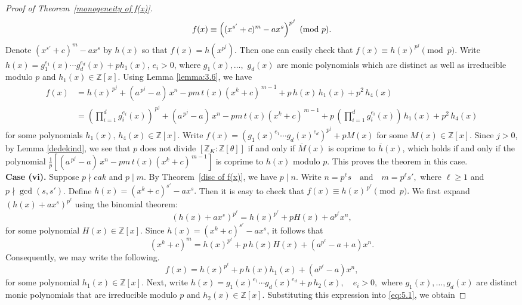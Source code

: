 \documentclass[table]{amsart}
\newcommand{\Z}{\mathbb{Z}}
\numberwithin{equation}{section}
\begin{document}
\begin{proof}[Proof of Theorem~\ref{monogeneity of f(x)}]
\[
f(x) \equiv \Bigl( (x^{s'} + c)^m - a x^s \Bigr)^{p^{j}} \pmod{p}.
\]
 Denote  $ (x^{s'} + c)^m - a x^s$ by $h(x)$ so that $f(x)=h(x^{p^j})$. Then one can easily check that $f(x)\equiv h(x)^{p^j} \pmod{p}$. Write $h(x) = g^{e_1}_1(x)\cdots g^{e_d}_d(x) + ph_1(x)$, $e_i>0$, where $g_1(x), \ldots,$ $g_d(x)$ are monic polynomials which are distinct as well as irreducible modulo $p$ and $h_1(x) \in \Z[x]$. Using Lemma \ref{lemma:3.6}, we have
\begin{align*}
    f(x) &=  h(x)^{\,p^{j}}+(a^{\,p^{j}} - a)\,x^{n} - p m\, t(x)(x^{k} + c)^{\,m-1}+ p\,h(x)\,h_{1}(x) + p^{2}\,h_{4}(x)\\
    &=\left(\prod\limits_{i=1}^{d}g^{e_i}_i(x)\right)^{\,p^j}+(a^{\,p^{j}} - a)\,x^{n} - p m\, t(x)(x^{k} + c)^{\,m-1}+ p\,\left(\prod\limits_{i=1}^{d}g^{e_i}_i(x)\right)\,h_{1}(x) + p^{2}\,h_{4}(x)
\end{align*}
for some polynomials $h_1(x),\,h_4(x)\in\Z[x]$. Write $f(x)=\left(g_1(x)^{e_1} \cdots g_d(x)^{e_d}\right)^{p^j}+p M(x)$ for some $M(x)\in\Z[x].$ Since  $j>0$, by Lemma \ref{dedekind}, we see that $p$ does not divide $[\Z_K :\Z[\theta]]$ if and only if $\overline{M}(x)$ is coprime to $\overline{h}(x)$, which holds if and only if the polynomial $\frac{1}{p}[(a^{\,p^{j}} - a)\,x^{n} - p m\, t(x)(x^{k} + c)^{\,m-1}]$ is coprime to $h(x)$ modulo $p$. This proves the theorem in this case.\\[2mm]
\textbf{Case (vi).} Suppose $p \nmid cak$ and $p \mid m$. By Theorem~\ref{disc of f(x)}, we have $p \mid n$. Write $n = p^{\ell}s \quad \text{and} \quad m = p^{\ell}s',$ where $\ell \ge 1$ and $p \nmid \gcd(s,s')$. Define $h(x) = (x^{k}+c)^{s'} - a x^{s}.$ Then it is easy to check that $f(x) \equiv h(x)^{\,p^{\ell}} \pmod{p}.$
We first expand $(h(x)+a x^{s})^{p^{\ell}}$ using the binomial theorem:
\[
(h(x)+a x^{s})^{p^{\ell}} = h(x)^{p^{\ell}} + pH(x) + a^{p^{\ell}}x^{n},
\]
for some polynomial $H(x)\in\mathbb{Z}[x]$. Since $h(x)=(x^{k}+c)^{s'}-a x^{s}$, it follows that
\[
(x^{k}+c)^{m}
= h(x)^{p^{\ell}} + p\,h(x)H(x) + (a^{p^{\ell}}-a+a)x^{n}.
\]
Consequently, we may write the following.
\begin{equation}\label{eq:5.1}
f(x) = h(x)^{p^{\ell}} + p\,h(x)h_{1}(x) + (a^{p^{\ell}}-a)x^{n},
\end{equation}
for some polynomial $h_{1}(x)\in\mathbb{Z}[x]$. Next, write $h(x)=g_{1}(x)^{e_{1}}\cdots g_{d}(x)^{e_{d}} + p\,h_{2}(x),
\quad e_i>0,$ where $g_{1}(x),\ldots,g_{d}(x)$ are distinct monic polynomials that are irreducible modulo $p$ and $h_{2}(x)\in\mathbb{Z}[x]$. Substituting this expression into \eqref{eq:5.1}, we obtain

\end{proof}
\end{document}
